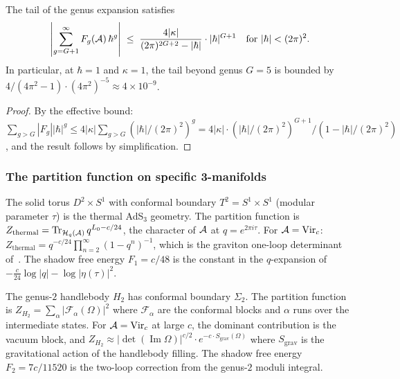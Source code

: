 \begin{corollary}
\label{cor:thqg-I-tail-bound}
The tail of the genus expansion satisfies
\begin{equation}\label{eq:thqg-I-tail}
\left|\sum_{g=G+1}^{\infty} F_g(\mathcal{A})\,\hbar^g\right| \;\leq\; \frac{4|\kappa|}{(2\pi)^{2G+2} - |\hbar|} \cdot |\hbar|^{G+1} \quad\text{for } |\hbar| < (2\pi)^2.
\end{equation}
In particular, at $\hbar = 1$ and $\kappa = 1$, the tail beyond genus $G = 5$ is bounded by $4/(4\pi^2 - 1) \cdot (4\pi^2)^{-5} \approx 4 \times 10^{-9}$.
\end{corollary}

\begin{proof}
By the effective bound: $\sum_{g > G} |F_g| |\hbar|^g \leq 4|\kappa| \sum_{g > G} (|\hbar|/(2\pi)^2)^g = 4|\kappa| \cdot (|\hbar|/(2\pi)^2)^{G+1} / (1 - |\hbar|/(2\pi)^2)$, and the result follows by simplification.
\end{proof}

\subsubsection{The partition function on specific 3-manifolds}

\begin{example}
\label{ex:thqg-I-solid-torus}
The solid torus $D^2 \times S^1$ with conformal boundary $T^2 = S^1 \times S^1$ (modular parameter $\tau$) is the thermal AdS$_3$ geometry. The partition function is $Z_{\mathrm{thermal}} = \operatorname{Tr}_{\mathcal{H}_q(\mathcal{A})} q^{L_0 - c/24}$, the character of $\mathcal{A}$ at $q = e^{2\pi i \tau}$. For $\mathcal{A} = \mathrm{Vir}_c$: $Z_{\mathrm{thermal}} = q^{-c/24}\prod_{n=2}^\infty (1-q^n)^{-1}$, which is the graviton one-loop determinant of~\cite{GMY08}. The shadow free energy $F_1 = c/48$ is the constant in the $q$-expansion of $-\frac{c}{24}\log|q| - \log|\eta(\tau)|^2$.
\end{example}

\begin{example}
\label{ex:thqg-I-genus2-handlebody}
The genus-$2$ handlebody $H_2$ has conformal boundary $\Sigma_2$. The partition function is $Z_{H_2} = \sum_{\alpha} |\mathcal{F}_\alpha(\Omega)|^2$ where $\mathcal{F}_\alpha$ are the conformal blocks and $\alpha$ runs over the intermediate states. For $\mathcal{A} = \mathrm{Vir}_c$ at large $c$, the dominant contribution is the vacuum block, and $Z_{H_2} \approx |\det(\operatorname{Im}\Omega)|^{c/2} \cdot e^{-c \cdot S_{\mathrm{grav}}(\Omega)}$ where $S_{\mathrm{grav}}$ is the gravitational action of the handlebody filling. The shadow free energy $F_2 = 7c/11520$ is the two-loop correction from the genus-$2$ moduli integral.
\end{example}

